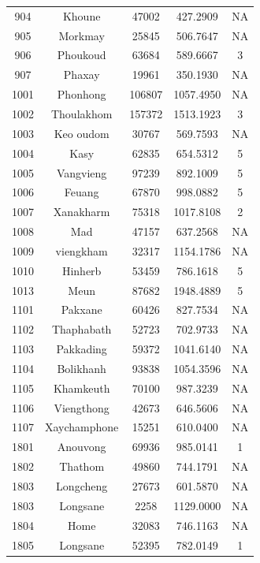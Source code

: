 \documentclass[
  letterpaper,
  DIV=11,
  numbers=noendperiod]{scrartcl}
\begin{document}
\begin{longtable}[]{@{}ccccc@{}}
904 & Khoune & 47002 & 427.2909 & NA \\
905 & Morkmay & 25845 & 506.7647 & NA \\
906 & Phoukoud & 63684 & 589.6667 & 3 \\
907 & Phaxay & 19961 & 350.1930 & NA \\
1001 & Phonhong & 106807 & 1057.4950 & NA \\
1002 & Thoulakhom & 157372 & 1513.1923 & 3 \\
1003 & Keo oudom & 30767 & 569.7593 & NA \\
1004 & Kasy & 62835 & 654.5312 & 5 \\
1005 & Vangvieng & 97239 & 892.1009 & 5 \\
1006 & Feuang & 67870 & 998.0882 & 5 \\
1007 & Xanakharm & 75318 & 1017.8108 & 2 \\
1008 & Mad & 47157 & 637.2568 & NA \\
1009 & viengkham & 32317 & 1154.1786 & NA \\
1010 & Hinherb & 53459 & 786.1618 & 5 \\
1013 & Meun & 87682 & 1948.4889 & 5 \\
1101 & Pakxane & 60426 & 827.7534 & NA \\
1102 & Thaphabath & 52723 & 702.9733 & NA \\
1103 & Pakkading & 59372 & 1041.6140 & NA \\
1104 & Bolikhanh & 93838 & 1054.3596 & NA \\
1105 & Khamkeuth & 70100 & 987.3239 & NA \\
1106 & Viengthong & 42673 & 646.5606 & NA \\
1107 & Xaychamphone & 15251 & 610.0400 & NA \\
1801 & Anouvong & 69936 & 985.0141 & 1 \\
1802 & Thathom & 49860 & 744.1791 & NA \\
1803 & Longcheng & 27673 & 601.5870 & NA \\
1803 & Longsane & 2258 & 1129.0000 & NA \\
1804 & Home & 32083 & 746.1163 & NA \\
1805 & Longsane & 52395 & 782.0149 & 1 \\
\end{longtable}
\end{document}
